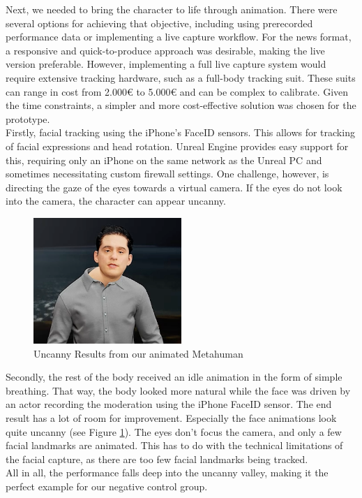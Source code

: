 \documentclass[
  a4paper,  %
  twoside,  %
  bibliography=totoc,
  headsepline,
  cleardoublepage=empty,
  parskip=half,
  draft=false
]{scrbook}
\begin{document}
Next, we needed to bring the character to life through animation. There were several options for achieving that objective, including using prerecorded performance data or implementing a live capture workflow. For the news format, a responsive and quick-to-produce approach was desirable, making the live version preferable. However, implementing a full live capture system would require extensive tracking hardware, such as a full-body tracking suit. These suits can range in cost from 2.000€ to 5.000€ and can be complex to calibrate. Given the time constraints, a simpler and more cost-effective solution was chosen for the prototype. \\
Firstly, facial tracking using the iPhone's FaceID sensors. This allows for tracking of facial expressions and head rotation. Unreal Engine provides easy support for this, requiring only an iPhone on the same network as the Unreal PC and sometimes necessitating custom firewall settings. One challenge, however, is directing the gaze of the eyes towards a virtual camera. If the eyes do not look into the camera, the character can appear uncanny. 

\begin{figure}[h]
  \centering
  \includegraphics[width=0.5\textwidth]{graphics/unreal-engine/MH/bent-head.png}
  \caption{Uncanny Results from our animated Metahuman}
  \label{fig:uncanny mh}
\end{figure}

Secondly, the rest of the body received an idle animation in the form of simple breathing. That way, the body looked more natural while the face was driven by an actor recording the moderation using the iPhone FaceID sensor. The end result has a lot of room for improvement. Especially the face animations look quite uncanny (see Figure \ref{fig:uncanny mh}). The eyes don't focus the camera, and only a few facial landmarks are animated. This has to do with the technical limitations of the facial capture, as there are too few facial landmarks being tracked. \\
All in all, the performance falls deep into the uncanny valley, making it the perfect example for our negative control group.
\end{document}
